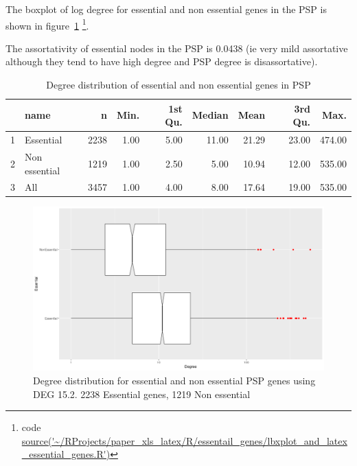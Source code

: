 The boxplot of log degree for essential and non essential genes in the PSP is shown in figure~\ref{fig:boxplot_log degree essential genes}
\footnote{code \url{source('~/RProjects/paper_xls_latex/R/essentail_genes/lbxplot_and_latex_essential_genes.R')}}.

The assortativity of essential nodes in the PSP is 0.0438 (ie very mild assortative although they tend to have high degree and PSP degree is disassortative).


\begin{table}[ht]
\centering
\begin{tabular}{rlrrrrrrr}
  \hline
 & name & n & Min. & 1st Qu. & Median & Mean & 3rd Qu. & Max. \\ 
  \hline
1 & Essential & 2238 & 1.00 & 5.00 & 11.00 & 21.29 & 23.00 & 474.00 \\ 
  2 & Non essential & 1219 & 1.00 & 2.50 & 5.00 & 10.94 & 12.00 & 535.00 \\ 
  3 & All & 3457 & 1.00 & 4.00 & 8.00 & 17.64 & 19.00 & 535.00 \\ 
   \hline
\end{tabular}
\caption{Degree distribution of essential and non essential genes in PSP}
\label{tab:degree distribution essential and non essential genes PSP}
\end{table}




\begin{figure}
    \centering
    \includegraphics[width=\textwidth]{images/Rplot_essential_non_essential_gene_degree.png}
    \caption{Degree distribution for essential and non essential PSP genes using DEG 15.2. 2238 Essential genes, 1219 Non essential}
    \label{fig:boxplot_log degree essential genes}
\end{figure}



